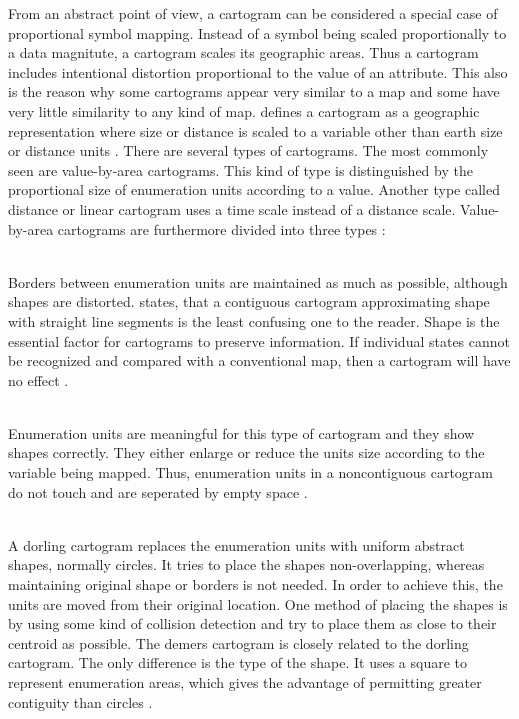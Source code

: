 From an abstract point of view, a cartogram can be considered a special case of proportional symbol mapping. Instead of a symbol being scaled proportionally to a data magnitute, a cartogram scales its geographic areas. Thus a cartogram includes intentional distortion proportional to the value of an attribute. This also is the reason why some cartograms appear very similar to a map and some have very little similarity to any kind of map. \citeauthor{Tyner2010} defines a cartogram as a geographic representation where size or distance is scaled to a variable other than earth size or distance units .
There are several types of cartograms. The most commonly seen are value-by-area cartograms. This kind of type is distinguished by the proportional size of enumeration units according to a value. Another type called distance or linear cartogram uses a time scale instead of a distance scale. Value-by-area cartograms are furthermore divided into three types :

\begin{enumerate}

 \hfill \\
Borders between enumeration units are maintained as much as possible, although shapes are distorted. \citeauthor{Tyner2010} states, that a contiguous cartogram approximating shape with straight line segments is the least confusing one to the reader. Shape is the essential factor for cartograms to preserve information. If individual states cannot be recognized and compared with a conventional map, then a cartogram will have no effect .

 \hfill \\
Enumeration units are meaningful for this type of cartogram and they show shapes correctly. They either enlarge or reduce the units size according to the variable being mapped. Thus, enumeration units in a noncontiguous cartogram do not touch and are seperated by empty space .

 \hfill \\
A dorling cartogram replaces the enumeration units with uniform abstract shapes, normally circles. It tries to place the shapes non-overlapping, whereas maintaining original shape or borders is not needed. In order to achieve this, the units are moved from their original location. One method of placing the shapes is by using some kind of collision detection and try to place them as close to their centroid as possible. The demers cartogram is closely related to the dorling cartogram. The only difference is the type of the shape. It uses a square to represent enumeration areas, which gives the advantage of permitting greater contiguity than circles .

\end{enumerate}

